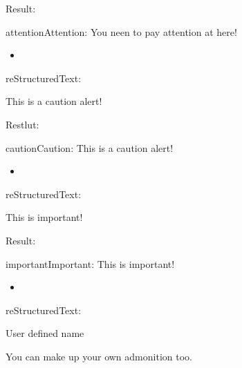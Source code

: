 \documentclass[letterpaper,11pt,english]{sphinxmanual}
\begin{document}
Result:

\begin{sphinxadmonition}{attention}{Attention:}
You neen to pay attention at here!
\end{sphinxadmonition}
\begin{itemize}
\item {} 

\end{itemize}

reStructuredText:

\begin{sphinxVerbatim}[commandchars=\\\{\}]
 

   This is a caution alert!
\end{sphinxVerbatim}

Restlut:

\begin{sphinxadmonition}{caution}{Caution:}
This is a caution alert!
\end{sphinxadmonition}
\begin{itemize}
\item {} 

\end{itemize}

reStructuredText:

\begin{sphinxVerbatim}[commandchars=\\\{\}]
 

        This is important!
\end{sphinxVerbatim}

Result:

\begin{sphinxadmonition}{important}{Important:}
This is important!
\end{sphinxadmonition}
\begin{itemize}
\item {} 

\end{itemize}

reStructuredText:

\begin{sphinxVerbatim}[commandchars=\\\{\}]
  User defined name

   You can make up your own admonition too.
\end{sphinxVerbatim}
\end{document}
